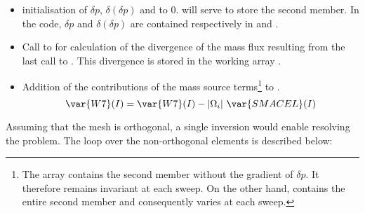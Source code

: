 \begin{itemize}
\item initialisation of $\delta p$, $\delta(\delta p)$ and  to 0.  will serve to store the second member. In the code, $\delta p$ and $\delta(\delta p)$ are contained respectively in  and .
\item Call to  for calculation of the divergence of the mass flux resulting from the last call to . This divergence is stored in the working array .
\item Addition of the contributions of the mass source terms\footnote{The array  contains the second member without the gradient of $\delta p$. It therefore remains invariant at each sweep. On the other hand,  contains the entire second member and consequently varies at each sweep.} to .
\begin{equation}
\var{W7}(I) =  \var{W7}(I) - |\Omega_i|\ \var{SMACEL}(I)
\label {SM2}
\end{equation}
\end{itemize}

Assuming that the mesh is orthogonal, a single inversion would enable resolving the problem. The loop over the non-orthogonal elements is described below:

